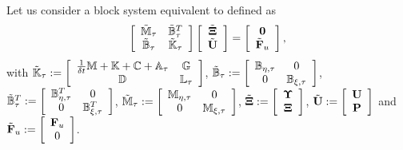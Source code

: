Let us consider a block system equivalent to  defined as
\begin{equation}
\label{eq-C5_NSblockmat}
\left[\begin{array}{cc}
\tilde{\mathbb{M}}_\tau&\tilde{\mathbb{B}}_\tau^T\\
\tilde{\mathbb{B}}_\tau&\tilde{\mathbb{K}}_\tau
\end{array}\right]\left[\begin{array}{c}
\tilde{{\boldsymbol{\Xi}}}\\
\tilde{{\bf U}}
\end{array}\right]=\left[\begin{array}{c}
\mathbf{0}\\
\tilde{{\bf F}}_u
\end{array}\right],
\end{equation}
with $\tilde{\mathbb{K}}_\tau:=\left[\begin{array}{cc}
\frac{1}{\delta t}\mathbb{M}+\mathbb{K}+\mathbb{C}+\mathbb{A}_\tau&\mathbb{G}\\
\mathbb{D}&\mathbb{L}_\tau
\end{array}\right]$, $\tilde{\mathbb{B}}_\tau:=\left[\begin{array}{cc}
\mathbb{B}_{\eta,\tau}&0\\
0&\mathbb{B}_{\xi,\tau}
\end{array}\right]$, $\tilde{\mathbb{B}}^T_\tau:=\left[\begin{array}{cc}
\mathbb{B}_{\eta,\tau}^T&0\\
0&\mathbb{B}_{\xi,\tau}^T
\end{array}\right]$, $\tilde{\mathbb{M}}_\tau:=\left[\begin{array}{cc}
\mathbb{M}_{\eta,\tau}&0\\
0&\mathbb{M}_{\xi,\tau}
\end{array}\right]$, $\tilde{{\boldsymbol{\Xi}}}:=\left[\begin{array}{c}
\boldsymbol{\Upsilon}\\
{\boldsymbol{\Xi}}
\end{array}\right]$, $\tilde{{\bf U}}:=\left[\begin{array}{c}
{\bf U}\\
{\bf P}
\end{array}\right]$  and $\tilde{{\bf F}}_u:=\left[\begin{array}{c}
{\bf F}_u\\
0
\end{array}\right]$.

